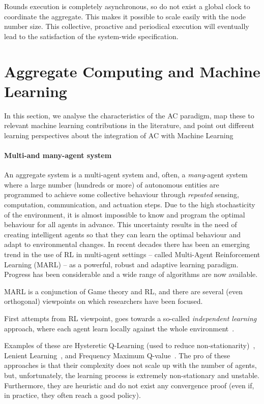 \documentclass[conference]{IEEEtran}
\begin{document}
Rounds execution is completely asynchronous, so do not exist a global clock to coordinate the aggregate. 
 This makes it possible to scale easily with the node number size. This collective, proactive and periodical execution will eventually lead to the satisfaction of the system-wide specification.

\section{Aggregate Computing and Machine Learning}\label{aggregate-and-machine-learning}

In this section, we analyse the characteristics of the AC paradigm,
 map these to relevant machine learning contributions in the literature,
 and point out different learning perspectives about the integration of AC with Machine Learning

\paragraph{Multi-and many-agent system}
%
An aggregate system is a multi-agent system
 and, often, a \emph{many}-agent system
 where a large number (hundreds or more)
 of autonomous entities are programmed to achieve 
 some collective behaviour through \emph{repeated} 
 sensing, computation, communication, and actuation steps.
%
Due to the high stochasticity of the environment,
 it is almost impossible to know and
 program the optimal behaviour for all agents in advance.
 This uncertainty results in the need of creating intelligent agents
 so that they can learn the optimal behaviour and adapt to environmental changes.
%
In recent decades there has been an emerging trend in the use of RL 
 in multi-agent settings -- called Multi-Agent Reinforcement Learning (MARL) -- as a powerful, robust and adaptive learning paradigm.
 Progress has been considerable and a wide range of algorithms are now available.

MARL is a conjunction of Game theory and RL, 
 and there are several (even orthogonal) viewpoints on which researchers have been focused.

First attempts from RL viewpoint, 
 goes towards a so-called \textit{independent learning}~\cite{DBLP:journals/tsmc/BusoniuBS08} approach, 
 where each agent learn locally against the whole environment~\cite{DBLP:conf/icml/Tan93}.

Examples of these are Hysteretic Q-Learning (used to reduce non-stationarity)~\cite{hysteretic-q}, 
 Lenient Learning~\cite{DBLP:journals/jmlr/WeiL16}, and Frequency Maximum Q-value~\cite{DBLP:conf/atal/KaisersT10}.
%
The pro of these approaches is that their complexity does not scale up with the number of agents, 
 but, unfortunately, the learning process is extremely non-stationary and unstable.
% 
Furthermore, they are heuristic and do not exist any convergence proof (even if, in practice, they often reach a good policy).
\end{document}
